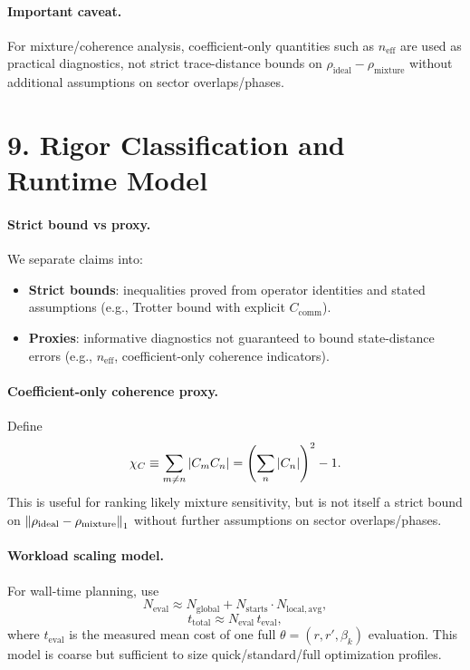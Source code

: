 \documentclass[11pt]{article}
\begin{document}
\paragraph{Important caveat.}
For mixture/coherence analysis, coefficient-only quantities such as $n_{\mathrm{eff}}$ are
used as practical diagnostics, not strict trace-distance bounds on
$\rho_{\mathrm{ideal}}-\rho_{\mathrm{mixture}}$ without additional assumptions on sector overlaps/phases.

\section*{9. Rigor Classification and Runtime Model}
\paragraph{Strict bound vs proxy.}
We separate claims into:
\begin{itemize}
\item \textbf{Strict bounds}: inequalities proved from operator identities and stated assumptions
(e.g., Trotter bound with explicit $C_{\mathrm{comm}}$).
\item \textbf{Proxies}: informative diagnostics not guaranteed to bound state-distance errors
(e.g., $n_{\mathrm{eff}}$, coefficient-only coherence indicators).
\end{itemize}

\paragraph{Coefficient-only coherence proxy.}
Define
\begin{equation}
\chi_C \equiv \sum_{m\neq n}\abs{C_m C_n}
=\left(\sum_n \abs{C_n}\right)^2-1.
\end{equation}
This is useful for ranking likely mixture sensitivity, but is not itself a strict
bound on $\norm{\rho_{\mathrm{ideal}}-\rho_{\mathrm{mixture}}}_1$ without further
assumptions on sector overlaps/phases.

\paragraph{Workload scaling model.}
For wall-time planning, use
\begin{equation}
N_{\mathrm{eval}}
\approx
N_{\mathrm{global}}
 + N_{\mathrm{starts}}\cdot N_{\mathrm{local,avg}},
\end{equation}
\begin{equation}
t_{\mathrm{total}} \approx N_{\mathrm{eval}}\,t_{\mathrm{eval}},
\end{equation}
where $t_{\mathrm{eval}}$ is the measured mean cost of one full
$\theta=(r,r',\beta_k)$ evaluation.
This model is coarse but sufficient to size quick/standard/full optimization profiles.
\end{document}
